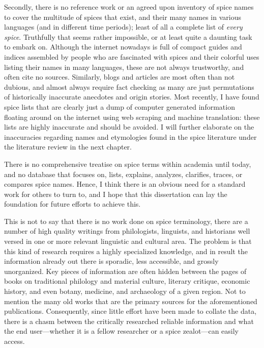 Secondly, there is no reference work or an agreed upon inventory of spice names to cover the multitude of spices that exist, and their many names in various languages (and in different time periods); least of all a complete list of \emph{every spice}. Truthfully that seems rather impossible, or at least quite a daunting task to embark on. Although the internet nowadays is full of compact guides and indices assembled by people who are fascinated with spices and their colorful uses listing their names in many languages, these are not always trustworthy, and often cite no sources. Similarly, blogs and articles are most often than not dubious, and almost always require fact checking as many are just permutations of historically inaccurate anecdotes and origin stories. Most recently, I have found spice lists that are clearly just a dump of computer generated information floating around on the internet using web scraping and machine translation: these lists are highly inaccurate and should be avoided. I will further elaborate on the inaccuracies regarding names and etymologies found in the spice literature under the literature review in the next chapter.

There is no comprehensive treatise on spice terms within academia until today, and no database that focuses on, lists, explains, analyzes, clarifies, traces, or compares spice names. Hence, I think there is an obvious need for a standard work for others to turn to, and I hope that this dissertation can lay the foundation for future efforts to achieve this.

This is not to say that there is no work done on spice terminology, there are a number of high quality writings from philologists, linguists, and historians well versed in one or more relevant linguistic and cultural area. The problem is that this kind of research requires a highly specialized knowledge, and in result the information already out there is sporadic, less accessible, and grossly unorganized. Key pieces of information are often hidden between the pages of books on traditional philology and material culture, literary critique, economic history, and even botany, medicine, and archaeology of a given region. Not to mention the many old works that are the primary sources for the aforementioned publications. Consequently, since little effort have been made to collate the data, there is a chasm between the critically researched reliable information and what the end user---whether it is a fellow researcher or a spice zealot---can easily access.




